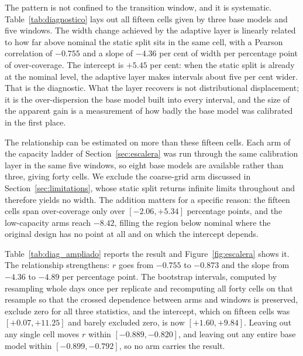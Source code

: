 \documentclass[preprint,3p,times]{elsarticle}
\providecommand{\DIFaddtex}[1]{{\protect\color{blue} \sf #1}} %
\providecommand{\DIFadd}[1]{\texorpdfstring{\DIFaddtex{#1}}{#1}} %
\begin{document}
\DIFadd{The pattern is not confined to the transition window, and it is systematic. Table~\ref{tab:diagnostico} lays out all fifteen cells given by three base models and five windows. The width change achieved by the adaptive layer is linearly related to how far above nominal the static split sits in the same cell, with a Pearson correlation of $-0.755$ and a slope of $-4.36$ per cent of width per percentage point of over-coverage. The intercept is $+5.45$ per cent: when the static split is already at the nominal level, the adaptive layer makes intervals about five per cent wider. That is the diagnostic. What the layer recovers is not distributional displacement; it is the over-dispersion the base model built into every interval, and the size of the apparent gain is a measurement of how badly the base model was calibrated in the first place.
}



\DIFadd{The relationship can be estimated on more than these fifteen cells. Each arm of the capacity ladder of Section~\ref{sec:escalera} was run through the same calibration layer in the same five windows, so eight base models are available rather than three, giving forty cells. We exclude the coarse-grid arm discussed in Section~\ref{sec:limitations}, whose static split returns infinite limits throughout and therefore yields no width. The addition matters for a specific reason: the fifteen cells span over-coverage only over $[-2.06, +5.34]$ percentage points, and the low-capacity arms reach $-8.42$, filling the region below nominal where the original design has no point at all and on which the intercept depends.
}



\DIFadd{Table~\ref{tab:diag_ampliado} reports the result and Figure~\ref{fig:escalera} shows it. The relationship strengthens: $r$ goes from $-0.755$ to $-0.873$ and the slope from $-4.36$ to $-4.89$ per percentage point. The bootstrap intervals, computed by resampling whole days once per replicate and recomputing all forty cells on that resample so that the crossed dependence between arms and windows is preserved, exclude zero for all three statistics, and the intercept, which on fifteen cells was $[+0.07, +11.25]$ and barely excluded zero, is now $[+1.60, +9.84]$. Leaving out any single cell moves $r$ within $[-0.889, -0.820]$, and leaving out any entire base model within $[-0.899, -0.792]$, so no arm carries the result.
}
\end{document}
